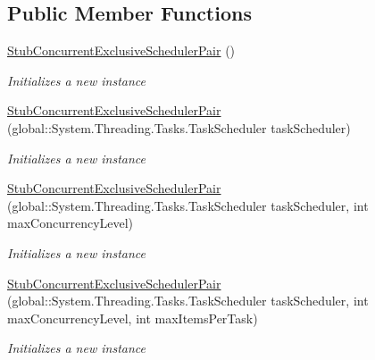 \subsection*{Public Member Functions}
\begin{DoxyCompactItemize}
\item 
\hyperlink{class_system_1_1_threading_1_1_tasks_1_1_fakes_1_1_stub_concurrent_exclusive_scheduler_pair_af6f1c816527918a8bbb1ef3f9c13aa18}{Stub\-Concurrent\-Exclusive\-Scheduler\-Pair} ()
\begin{DoxyCompactList}\small\item\em Initializes a new instance\end{DoxyCompactList}\item 
\hyperlink{class_system_1_1_threading_1_1_tasks_1_1_fakes_1_1_stub_concurrent_exclusive_scheduler_pair_a402d7ae573a629196e9660f179a00b3e}{Stub\-Concurrent\-Exclusive\-Scheduler\-Pair} (global\-::\-System.\-Threading.\-Tasks.\-Task\-Scheduler task\-Scheduler)
\begin{DoxyCompactList}\small\item\em Initializes a new instance\end{DoxyCompactList}\item 
\hyperlink{class_system_1_1_threading_1_1_tasks_1_1_fakes_1_1_stub_concurrent_exclusive_scheduler_pair_af380956d3755cba54d91194aaf1011d6}{Stub\-Concurrent\-Exclusive\-Scheduler\-Pair} (global\-::\-System.\-Threading.\-Tasks.\-Task\-Scheduler task\-Scheduler, int max\-Concurrency\-Level)
\begin{DoxyCompactList}\small\item\em Initializes a new instance\end{DoxyCompactList}\item 
\hyperlink{class_system_1_1_threading_1_1_tasks_1_1_fakes_1_1_stub_concurrent_exclusive_scheduler_pair_ae6cb09aa09b9f6f57e0be5567be2c79d}{Stub\-Concurrent\-Exclusive\-Scheduler\-Pair} (global\-::\-System.\-Threading.\-Tasks.\-Task\-Scheduler task\-Scheduler, int max\-Concurrency\-Level, int max\-Items\-Per\-Task)
\begin{DoxyCompactList}\small\item\em Initializes a new instance\end{DoxyCompactList}\end{DoxyCompactItemize}
